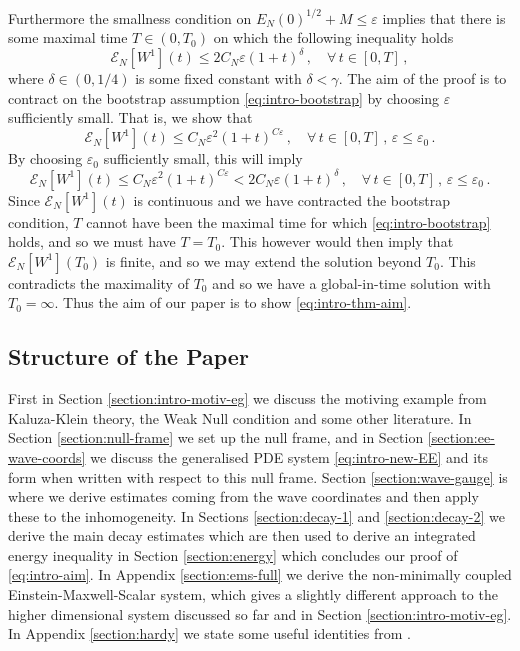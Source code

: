 \documentclass[11pt, a4paper]{amsart}
\numberwithin{equation}{section}
\numberwithin{theorem}{section}
\begin{document}
Furthermore the smallness condition on $E_N(0)^{1/2} +M\leq \varepsilon$ implies that there is some maximal time $T \in (0, T_0)$ on which the following inequality holds
\begin{equation} \mathcal{E}_N[W^1](t) \leq 2 C_N \varepsilon (1+t)^\delta\,,  \quad \forall \, t \in [0,T] \,, \label{eq:intro-bootstrap} \end{equation}
where $\delta \in (0,1/4)$ is some fixed constant with $\delta < \gamma$. The aim of the proof is to contract on the bootstrap assumption \eqref{eq:intro-bootstrap} by choosing $\varepsilon$ sufficiently small. That is, we show that
\begin{equation}\mathcal{E}_N[W^1](t) \leq  C_N \varepsilon^2 (1+t)^{C \varepsilon}\,,  \quad \forall \, t \in [0, T] \,, \,  \varepsilon \leq \varepsilon_0 \,. \label{eq:intro-aim} \end{equation}
By choosing $\varepsilon_0$ sufficiently small, this will imply
$$ \mathcal{E}_N[W^1](t) \leq  C_N \varepsilon^2 (1+t)^{C \varepsilon} < 2 C_N \varepsilon (1+t)^\delta \,, \quad \forall \, t \in [0, T] \,,\,  \varepsilon \leq \varepsilon_0 \,. $$
Since $\mathcal{E}_N[W^1](t)$ is continuous and we have contracted the bootstrap condition, $T$ cannot have been the maximal time for which \eqref{eq:intro-bootstrap} holds, and so we must have $T=T_0$. This however would then imply that $\mathcal{E}_N[W^1](T_0)$ is finite, and so we may extend the solution beyond $T_0$. This contradicts the maximality of $T_0$ and so we have a global-in-time solution with $T_0 = \infty$. Thus the aim of our paper is to show \eqref{eq:intro-thm-aim}.

\subsection{Structure of the Paper}
 First in Section \ref{section:intro-motiv-eg} we discuss the motiving example from Kaluza-Klein theory, the Weak Null condition and some other literature. In Section \ref{section:null-frame} we set up the null frame, and in Section \ref{section:ee-wave-coords} we discuss the generalised PDE system \eqref{eq:intro-new-EE} and its form  when written with respect to this null frame.  Section \ref{section:wave-gauge} is where we derive estimates coming from the wave coordinates and then apply these to the inhomogeneity. In Sections \ref{section:decay-1} and \ref{section:decay-2} we derive the main decay estimates which are then used to derive an integrated energy inequality in Section \ref{section:energy} which concludes our proof of \eqref{eq:intro-aim}. In Appendix \ref{section:ems-full} we derive the non-minimally coupled Einstein-Maxwell-Scalar system, which gives a slightly different approach to the higher dimensional system discussed so far and in Section \ref{section:intro-motiv-eg}. In Appendix \ref{section:hardy} we state some useful identities from \cite{LR:04}. 
\end{document}

